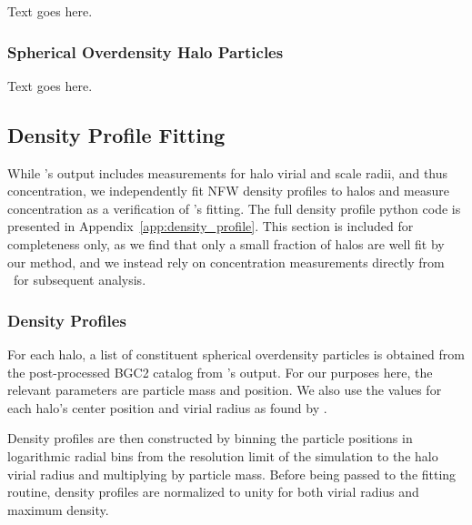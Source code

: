 Text goes here.



\subsubsection{Spherical Overdensity Halo Particles}
\label{subsubsec:analysis--halo_properties--spherical_overdensity}


Text goes here.




\subsection{Density Profile Fitting}
\label{subsec:analysis--profile_fitting}


While \rockstar's output includes measurements for halo virial and scale radii, and thus concentration, we independently fit NFW density profiles to halos and measure concentration as a verification of \rockstar's fitting.  The full density profile python code is presented in Appendix~\ref{app:density_profile}.  This section is included for completeness only, as we find that only a small fraction of halos are well fit by our method, and we instead rely on concentration measurements directly from \rockstar\ for subsequent analysis.



\subsubsection{Density Profiles}
\label{subsubsec:analysis--profile_fitting--density_profiles}


For each halo, a list of constituent spherical overdensity particles is obtained from the post-processed BGC2 catalog from \rockstar's output.  For our purposes here, the relevant parameters are particle mass and position.  We also use the values for each halo's center position and virial radius as found by \rockstar.

Density profiles are then constructed by binning the particle positions in logarithmic radial bins from the resolution limit of the simulation to the halo virial radius and multiplying by particle mass.  Before being passed to the fitting routine, density profiles are normalized to unity for both virial radius and maximum density. 



